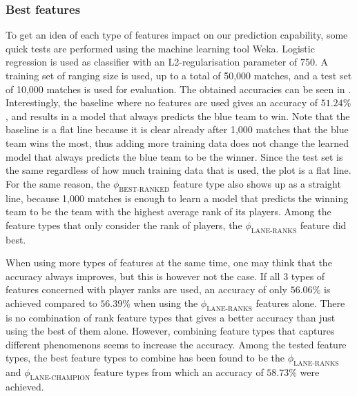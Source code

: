 \subsubsection{Best features}
\label{sec:best-features}
To get an idea of each type of features impact on our prediction capability, some quick tests are performed using the machine learning tool Weka.
Logistic regression is used as classifier with an L2-regularisation parameter of 750. A training set of ranging size is used, up to a total of 50,000 matches, and a test set of 10,000 matches is used for evaluation.
The obtained accuracies can be seen in .
Interestingly, the baseline where no features are used gives an accuracy of $51.24 \%$, and results in a model that always predicts the blue team to win.
Note that the baseline is a flat line because it is clear already after 1,000 matches that the blue team wins the most, thus adding more training data does not change the learned model that always predicts the blue team to be the winner. Since the test set is the same regardless of how much training data that is used, the plot is a flat line. For the same reason, the $\phi_\text{BEST-RANKED}$ feature type also shows up as a straight line, because 1,000 matches is enough to learn a model that predicts the winning team to be the team with the highest average rank of its players.
Among the feature types that only consider the rank of players, the $\phi_\text{LANE-RANKS}$ feature did best.

When using more types of features at the same time, one may think that the accuracy always improves, but this is however not the case.
If all 3 types of features concerned with player ranks are used, an accuracy of only $56.06\%$ is achieved compared to $56.39\%$ when using the $\phi_\text{LANE-RANKS}$ features alone. There is no combination of rank feature types that gives a better accuracy than just using the best of them alone.
However, combining feature types that captures different phenomenons seems to increase the accuracy.
Among the tested feature types, the best feature types to combine has been found to be the $\phi_\text{LANE-RANKS}$ and $\phi_\text{LANE-CHAMPION}$ feature types from which an accuracy of $58.73 \%$ were achieved.



